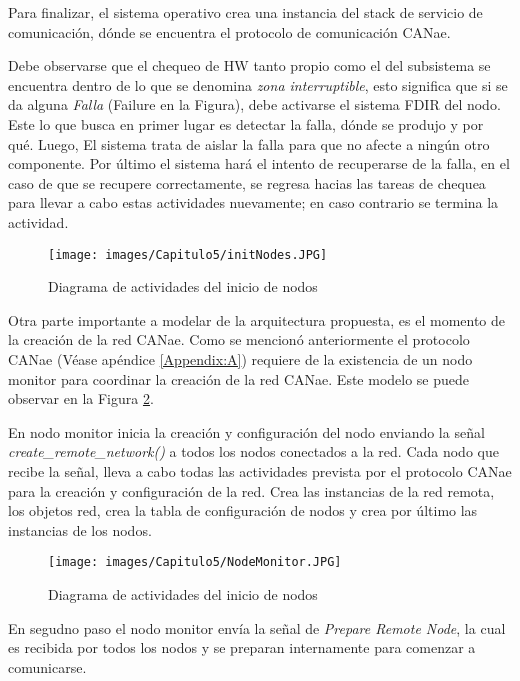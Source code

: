 Para finalizar, el sistema operativo crea una instancia del stack de servicio de
comunicación, dónde se encuentra el protocolo de comunicación CANae.

Debe observarse que el chequeo de \ac{HW} tanto propio como el del
subsistema se encuentra dentro de lo que se denomina \textit{zona interruptible},
esto significa que si se da alguna \textit{Falla} (Failure en la Figura), debe
activarse el sistema FDIR del nodo. Este lo que busca en primer lugar
es detectar la falla, dónde se produjo y por qué. Luego, El sistema trata de
aislar la falla para que no afecte a ningún otro componente. Por último el
sistema hará el intento de recuperarse de la falla, en el caso de que se
recupere correctamente, se regresa hacias las tareas de chequea para
llevar a cabo estas actividades nuevamente; en caso contrario se termina la actividad.

\begin{figure}[h!]
 \centering
 \texttt{[image: images/Capitulo5/initNodes.JPG]}
  \caption{Diagrama de actividades del inicio de nodos}
  \label{fig:initNodes}
\end{figure}

Otra parte importante a modelar de la arquitectura propuesta, es el momento
de la creación de la red CANae. Como se mencionó anteriormente el protocolo
CANae (Véase apéndice \ref{Appendix:A}) requiere de la existencia de un nodo monitor
para coordinar la creación de la red CANae. Este modelo se puede observar
en la Figura \ref{fig:NodeMonitor}.

En nodo monitor inicia la creación y configuración del nodo enviando la
señal \textit{create\_remote\_network()} a todos los nodos conectados a la
red. Cada nodo que recibe la señal, lleva a cabo todas las actividades prevista
por el protocolo CANae para la creación y configuración de la red. Crea las instancias
de la red remota, los objetos red, crea la tabla de configuración de nodos y crea
por último las instancias de los nodos.

\begin{figure}[h!]
 \centering
 \texttt{[image: images/Capitulo5/NodeMonitor.JPG]}
  \caption{Diagrama de actividades del inicio de nodos}
  \label{fig:NodeMonitor}
\end{figure}

En segudno paso el nodo monitor envía la señal de \textit{Prepare Remote Node}, la
cual es recibida por todos los nodos y se preparan internamente para comenzar a
comunicarse.

